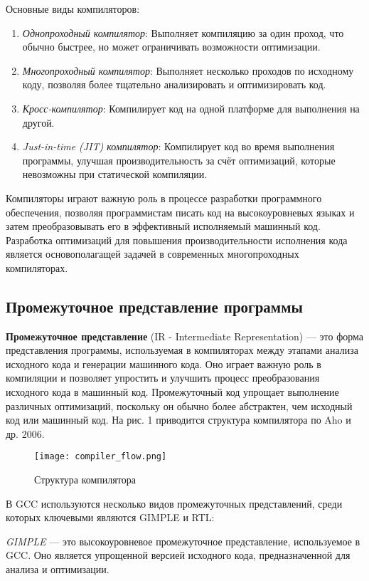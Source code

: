 Основные виды компиляторов:
\begin{enumerate}
    \item \textit{Однопроходный компилятор}: Выполняет компиляцию за один проход, что обычно быстрее, но может ограничивать возможности оптимизации.
    \item \textit{Многопроходный компилятор}: Выполняет несколько проходов по исходному коду, позволяя более тщательно анализировать и оптимизировать код.
    \item \textit{Кросс-компилятор}: Компилирует код на одной платформе для выполнения на другой.
    \item \textit{Just-in-time (JIT) компилятор}: Компилирует код во время выполнения программы, улучшая производительность за счёт оптимизаций, которые невозможны при статической компиляции.
\end{enumerate}

Компиляторы играют важную роль в процессе разработки программного обеспечения, позволяя программистам писать код на высокоуровневых языках и затем преобразовывать его в эффективный исполняемый машинный код. Разработка оптимизаций для повышения производительности исполнения кода является основополагащей задачей в современных многопроходных компиляторах.

\subsection{Промежуточное представление программы}

\textbf{Промежуточное представление} (IR - Intermediate Representation) — это форма представления программы, используемая в компиляторах между этапами анализа исходного кода и генерации машинного кода. Оно играет важную роль в компиляции и позволяет упростить и улучшить процесс преобразования исходного кода в машинный код. Промежуточный код упрощает выполнение различных оптимизаций, поскольку он обычно более абстрактен, чем исходный код или машинный код.  На рис. 1 приводится структура
компилятора по Aho и др. 2006. \todo[ссылка]

\begin{figure}[!htb]
    \centering
    \texttt{[image: compiler\_flow.png]}
    \caption{Структура компилятора}
\end{figure}

В GCC используются несколько видов промежуточных представлений, среди которых ключевыми являются GIMPLE и RTL:

\textit{GIMPLE} — это высокоуровневое промежуточное представление, используемое в GCC. Оно является упрощенной версией исходного кода, предназначенной для анализа и оптимизации. 

